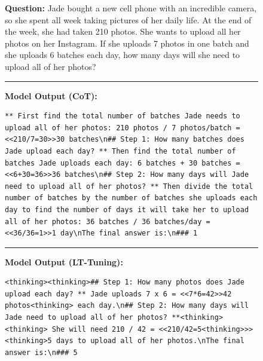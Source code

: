 \documentclass{article}
\theoremstyle{plain}
\theoremstyle{definition}
\theoremstyle{remark}
\begin{document}
\begin{figure}[h]
\centering
\begin{tcolorbox}[colback=blue!5, colframe=blue!50, title=Example 5]
\textbf{Question:} Jade bought a new cell phone with an incredible camera, so she spent all week taking pictures of her daily life. At the end of the week, she had taken 210 photos. She wants to upload all her photos on her Instagram. If she uploads 7 photos in one batch and she uploads 6 batches each day, how many days will she need to upload all of her photos?

\rule{\linewidth}{0.7pt}

\textbf{Model Output (CoT):}

\begin{lstlisting}
** First find the total number of batches Jade needs to upload all of her photos: 210 photos / 7 photos/batch = <<210/7=30>>30 batches\n## Step 1: How many batches does Jade upload each day? ** Then find the total number of batches Jade uploads each day: 6 batches + 30 batches = <<6+30=36>>36 batches\n## Step 2: How many days will Jade need to upload all of her photos? ** Then divide the total number of batches by the number of batches she uploads each day to find the number of days it will take her to upload all of her photos: 36 batches / 36 batches/day = <<36/36=1>>1 day\nThe final answer is:\n### 1
\end{lstlisting}
\rule{\linewidth}{0.7pt}
\textbf{Model Output (LT-Tuning):}
\begin{lstlisting}
<thinking><thinking>## Step 1: How many photos does Jade upload each day? ** Jade uploads 7 x 6 = <<7*6=42>>42 photos<thinking> each day.\n## Step 2: How many days will Jade need to upload all of her photos? **<thinking><thinking> She will need 210 / 42 = <<210/42=5<thinking>>><thinking>5 days to upload all of her photos.\nThe final answer is:\n### 5
\end{lstlisting}
\end{tcolorbox}
\label{fig:example5}
\end{figure}



\end{document}
